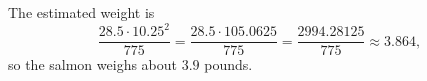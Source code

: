 The estimated weight is
\[\dfrac{28.5\cdot10.25^2}{775}=\dfrac{28.5\cdot105.0625}{775}=\dfrac{2994.28125}{775}\approx3.864,\]
so the salmon weighs about $\boxed{3.9}$ pounds.
